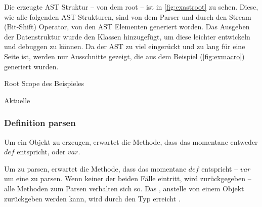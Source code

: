 {    Die erzeugte AST Struktur -- von dem root  -- ist in \autoref{fig:exastroot} zu sehen. Diese, wie alle folgenden AST Strukturen, sind von dem Parser und durch den Stream (Bit-Shift) Operator, von den AST Elementen generiert worden. Das Ausgeben der Datenstruktur wurde den  Klassen hinzugefügt, um diese leichter entwickeln und debuggen zu können. Da der AST zu viel eingerückt und zu lang für eine Seite ist, werden nur Ausschnitte gezeigt, die aus dem Beispiel (\autoref{fig:exmacro}) generiert wurden.
    \begin{paracol}{2}
      \begin{myCodeEnv}
        \centering
        \begin{myInvBox}[width=.9\linewidth]
          
        \end{myInvBox}
        \caption{Root Scope des Beispieles}
        \label{fig:exastroot}
      \end{myCodeEnv}
      \switchcolumn
      \begin{myCodeEnv}
        \centering
        \begin{myInvBox}[width=.9\linewidth]
          
        \end{myInvBox}
        \caption*{Aktuelle }
      \end{myCodeEnv}
    \end{paracol}

    \subsubsection{Definition parsen}
    \label{sssec:Definition parsen}
      Um ein  Objekt zu erzeugen, erwartet die  Methode, dass das momentane  entweder \myRIn$def$ entspricht, oder \myRIn$var$.

      Um  zu parsen, erwartet die Methode, dass das momentane  \myRIn$def$ entspricht -- \myRIn$var$ um eine  zu parsen. Wenn keiner der beiden Fälle eintritt, wird  zurückgegeben -- alle Methoden zum Parsen verhalten sich so. Das , anstelle von einem  Objekt zurückgeben werden kann, wird durch den  Typ erreicht \autocite{cpp-fundamentals}.

}
